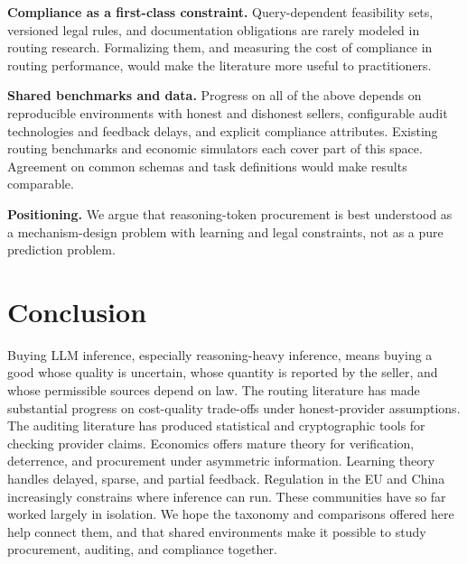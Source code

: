 \documentclass[sigconf]{acmart}
\begin{document}
\textbf{Compliance as a first-class constraint.} Query-dependent feasibility sets, versioned legal rules, and documentation obligations \cite{eu2024aiact, cac2024crossborder} are rarely modeled in routing research. Formalizing them, and measuring the cost of compliance in routing performance, would make the literature more useful to practitioners.

\textbf{Shared benchmarks and data.} Progress on all of the above depends on reproducible environments with honest and dishonest sellers, configurable audit technologies and feedback delays, and explicit compliance attributes. Existing routing benchmarks \cite{hu2024routerbench} and economic simulators \cite{zheng2022aieconomist} each cover part of this space. Agreement on common schemas and task definitions would make results comparable.

\textbf{Positioning.} We argue that reasoning-token procurement is best understood as a mechanism-design problem with learning and legal constraints, not as a pure prediction problem.

\section{Conclusion}\label{conclusion}

Buying LLM inference, especially reasoning-heavy inference, means buying a good whose quality is uncertain, whose quantity is reported by the seller, and whose permissible sources depend on law. The routing literature has made substantial progress on cost-quality trade-offs under honest-provider assumptions. The auditing literature has produced statistical and cryptographic tools for checking provider claims. Economics offers mature theory for verification, deterrence, and procurement under asymmetric information. Learning theory handles delayed, sparse, and partial feedback. Regulation in the EU and China increasingly constrains where inference can run. These communities have so far worked largely in isolation. We hope the taxonomy and comparisons offered here help connect them, and that shared environments make it possible to study procurement, auditing, and compliance together.




\end{document}
